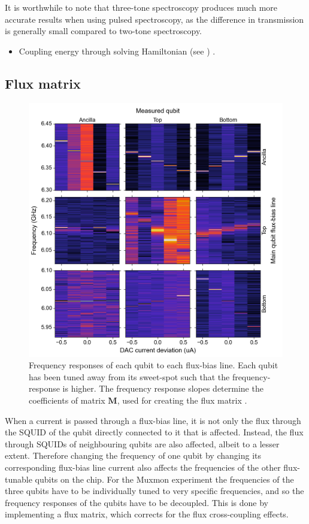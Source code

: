         It is worthwhile to note that three-tone spectroscopy produces much more accurate results when using pulsed spectroscopy, as the difference in transmission is generally small compared to two-tone spectroscopy.


        \begin{itemize}
           \item Coupling energy through solving Hamiltonian (see \cite{Reed}) .
        \end{itemize}

      \subsection{Flux matrix}
        \label{ssec:Flux matrix}

        \begin{figure}[tb]
          \centering
          \includegraphics[width=\textwidth]{../Figures/Qubit characterization/Flux_matrix.png}
          \caption{Frequency responses of each qubit to each flux-bias line. Each qubit has been tuned away from its sweet-spot such that the frequency-response is higher. The frequency response slopes determine the coefficients of matrix $\boldsymbol{M}$, used for creating the flux matrix .}
          \label{fig:flux matrix}
        \end{figure}
        When a current is passed through a flux-bias line, it is not only the flux through the SQUID of the qubit directly connected to it that is affected. Instead, the flux through SQUIDs of neighbouring qubits are also affected, albeit to a lesser extent. Therefore changing the frequency of one qubit by changing its corresponding flux-bias line current also affects the frequencies of the other flux-tunable qubits on the chip. For the Muxmon experiment the frequencies of the three qubits have to be individually tuned to very specific frequencies, and so the frequency responses of the qubits have to be decoupled. This is done by implementing a flux matrix, which corrects for the flux cross-coupling effects.

